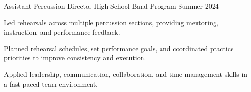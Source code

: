 

\begin{cventries}

  \cventry
    {Assistant Percussion Director} %
    {High School Band Program} %
    {} %
    {Summer 2024} %
    {
      \begin{cvitems}
        \item {Led rehearsals across multiple percussion sections, providing mentoring, instruction, and performance feedback.}
        \item {Planned rehearsal schedules, set performance goals, and coordinated practice priorities to improve consistency and execution.}
        \item {Applied leadership, communication, collaboration, and time management skills in a fast-paced team environment.}
      \end{cvitems}
    }


\end{cventries}
